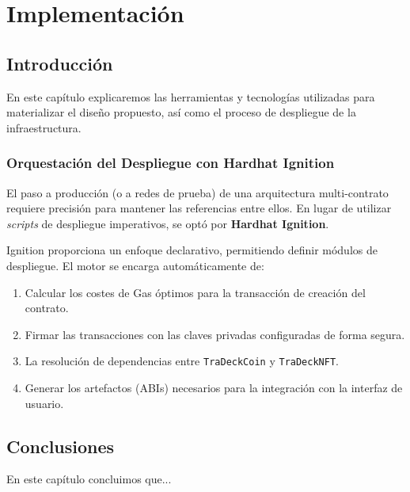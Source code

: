 \chapter{Implementación}\label{cap:implementacion}

\section{Introducción}
En este capítulo explicaremos las herramientas y tecnologías utilizadas para materializar el diseño 
propuesto, así como el proceso de despliegue de la infraestructura.


\subsection{Orquestación del Despliegue con Hardhat Ignition}
El paso a producción (o a redes de prueba) de una arquitectura multi-contrato requiere precisión para 
mantener las referencias entre ellos. En lugar de utilizar \textit{scripts} de despliegue imperativos, 
se optó por \textbf{Hardhat Ignition}.

Ignition proporciona un enfoque declarativo, permitiendo definir módulos de despliegue. El motor se 
encarga automáticamente de:
\begin{enumerate}
    \item Calcular los costes de Gas óptimos para la transacción de creación del contrato.
    \item Firmar las transacciones con las claves privadas configuradas de forma segura.
    \item La resolución de dependencias entre \texttt{TraDeckCoin} y \texttt{TraDeckNFT}.
    \item Generar los artefactos (ABIs) necesarios para la integración con la interfaz de usuario.
\end{enumerate}



\section{Conclusiones}
En este capítulo concluimos que...